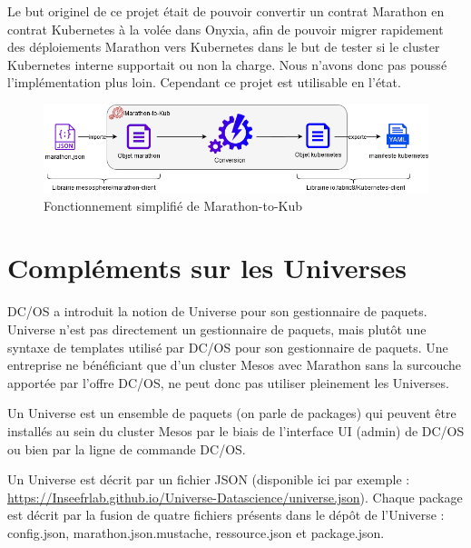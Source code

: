 \documentclass[11pt,fleqn]{book} %
\begin{document}
Le but originel de ce projet était de pouvoir convertir un contrat Marathon en contrat Kubernetes à la volée dans Onyxia, afin de pouvoir migrer rapidement des déploiements Marathon vers Kubernetes dans le but de tester si le cluster Kubernetes interne supportait ou non la charge. Nous n'avons donc pas poussé l'implémentation plus loin. Cependant ce projet est utilisable en l'état.

\begin{figure}[H]
\hspace{-0.5cm}
\renewcommand{\figurename}{Schéma}
\includegraphics[scale=0.6,trim={0 0 0 0},clip ]{Pictures/Comparaison/deployer/marathontokub.png}
\captionsetup{margin=1.5cm,format=hang,justification=justified}
\caption[]{Fonctionnement simplifié de Marathon-to-Kub \newline}
\end{figure}



\chapter{Compléments sur les Universes}
\label{Universe}
\vspace{-2cm}
DC/OS a introduit la notion de Universe pour son gestionnaire de paquets. Universe n'est pas directement un gestionnaire de paquets, mais plutôt une syntaxe de templates  utilisé par DC/OS pour son gestionnaire de paquets. Une entreprise ne bénéficiant que d'un cluster Mesos avec Marathon sans la surcouche apportée par l'offre DC/OS, ne peut donc pas utiliser pleinement les Universes. \newline

Un Universe est un ensemble de paquets (on parle de packages) qui peuvent être installés au sein du cluster Mesos par le biais de l'interface UI (admin) de DC/OS ou bien par la ligne de commande DC/OS.\newline


Un Universe est décrit par un fichier JSON (disponible ici par exemple : \url{https://Inseefrlab.github.io/Universe-Datascience/universe.json}). Chaque package  est décrit par la fusion de quatre fichiers présents dans le dépôt de l'Universe : config.json, marathon.json.mustache, ressource.json et package.json.
\end{document}
